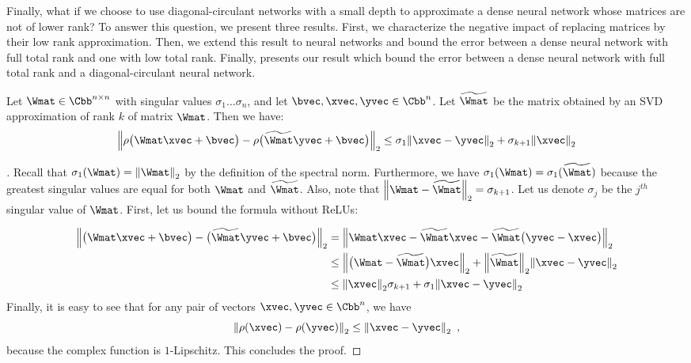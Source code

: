 Finally, what if we choose to use diagonal-circulant networks with a small depth to approximate a dense neural network whose matrices are not of lower rank? 
To answer this question, we present three results. First, we characterize the negative impact of replacing matrices by their low rank approximation.
Then, we extend this result to neural networks and bound the error between a dense neural network with full total rank and one with low total rank.
Finally,  presents our result which bound the error between a dense neural network with full total rank and a diagonal-circulant neural network.


\begin{lemma} \label{lemma:ch4-bound_one_layer}
  Let $\Wmat \in \Cbb^{n \times n}$ with singular values $\sigma_1 \ldots \sigma_n$, and let $\bvec, \xvec, \yvec \in \Cbb^n$.
  Let $\widetilde{\Wmat}$ be the matrix obtained by an SVD approximation of rank $k$ of matrix $\Wmat$.
  Then we have:
  \begin{equation}
    \norm{ \act \big( \Wmat\xvec + \bvec \big) - \act \big( \widetilde{\Wmat}\yvec + \bvec \big)}_2 \le \sigma_{1} \norm{\xvec - \yvec}_2 + \sigma_{k+1} \norm{\xvec}_2 
  \end{equation}
  \removespace
\end{lemma}

\begin{proof}[]
  Recall that $\sigma_1(\Wmat) = \norm{\Wmat}_2$ by the definition of the spectral norm.
  Furthermore, we have $\sigma_1(\Wmat) = \sigma_1(\widetilde{\Wmat})$ because the greatest singular values are equal for both $\Wmat$ and $\widetilde{\Wmat}$.
  Also, note that $\norm{\Wmat - \widetilde{\Wmat}}_{2} = \sigma_{k+1}$.
  Let us denote $\sigma_j$ be the $j^{th}$ singular value of $\Wmat$.
  First, let us bound the formula without ReLUs:

  \begin{align}
    \norm{\big(\Wmat\xvec+\bvec\big) - \big(\widetilde{\Wmat} \yvec + \bvec \big)}_2 &= \norm{\Wmat\xvec - \widetilde{\Wmat} \xvec - \widetilde{\Wmat} \big(\yvec - \xvec \big)}_2 \\
     &\le \norm{\big(\Wmat - \widetilde{\Wmat}\big)\xvec}_2 + \norm{\widetilde{\Wmat}}_{2} \norm{\xvec - \yvec}_2 \\
     &\le \norm{\xvec}_2 \sigma_{k+1} + \sigma_1 \norm{\xvec - \yvec}_2 
  \end{align}
  Finally, it is easy to see that for any pair of vectors $\xvec,\yvec \in \Cbb^n$, we have
  \begin{equation}
    \norm{ \act(\xvec) - \act(\yvec)}_2 \le \norm{\xvec - \yvec}_2 \enspace,
  \end{equation}
  because the complex \relu function is $1$-Lipschitz.
  This concludes the proof.
\end{proof}

